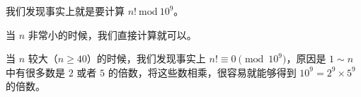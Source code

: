 我们发现事实上就是要计算 $n!\ \mathrm{mod}\ 10^9$。

当 $n$ 非常小的时候，我们直接计算就可以。

当 $n$ 较大（$n\ge 40$）的时候，我们发现事实上 $n!\equiv 0\pmod {10^9}$，原因是 $1\sim n$ 中有很多数是 $2$ 或者 $5$ 的倍数，将这些数相乘，很容易就能够得到 $10^9=2^9\times 5^9$ 的倍数。